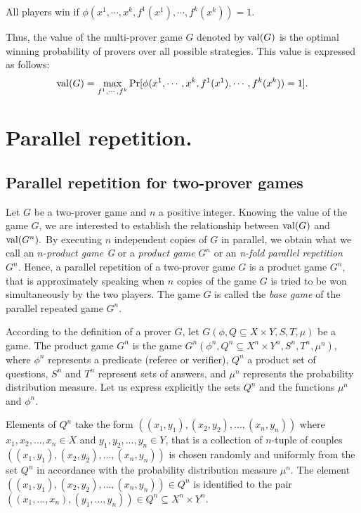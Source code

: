 All players win if $\phi (x^1, \cdots , x^k, f^1(x^1), \cdots , f^k(x^k))=1.$ 

Thus, the value of the multi-prover game $G$ denoted by $\mathrm{val} (G)$ is  the optimal winning probability of provers over all possible strategies. This value is expressed as follows:
$$\mathrm{val} (G)= \max_{f^1, \cdots , f^k} \Pr[\phi (x^1, \cdots , x^k, f^1(x^1), \cdots , f^k(x^k))=1].$$



\section{Parallel repetition.}

\subsection{Parallel repetition for  two-prover games} \label{prtp}

Let $G$ be a two-prover game and $n$ a positive integer. Knowing the value of the game $G$, we are interested 
to establish the relationship between $\mathrm{val} (G)$ and $\mathrm{val} (G^n).$  By executing  $n$ independent copies of $G$ in parallel, we obtain what we call an $n$-\textit{product game G} or a \textit{product game} $G^n$ or an \textit{n-fold parallel repetition} $G^n.$ Hence, a parallel repetition of a two-prover game $G$ is a product game $G^n$, that is approximately
speaking when $n$ copies of the game $G$ is tried to be won simultaneously by the two players. The game $G$ is called  the \textit{base game} of the parallel repeated game $G^n.$

According to the definition of a prover $G$, let $G(\phi, Q \subseteq X \times Y, S, T, \mu)$ be a game. The product game $G^n$ is the game $G^n(\phi^n, Q^n\subseteq X^n \times Y^n, S^n, T^n, \mu^n)$, where $\phi^n$ represents a predicate (referee or verifier), $Q^n$ a product set of questions, $S^n$ and $T^n$ represent sets of answers, and $\mu^n$ represents the probability distribution measure. Let us express explicitly the sets $Q^n$ and the functions $\mu^n$ and $\phi^n.$

 Elements of $Q^n$ take the form $((x_1, y_1),(x_2,y_2 ), \ldots, (x_n, y_n))$ where $x_1, x_2, \ldots, x_n \in X$ and $y_1, y_2, \ldots, y_n \in Y$, that is a collection of $n$-tuple of couples  $((x_1, y_1),(x_2,y_2 ), \ldots, (x_n, y_n))$ is chosen randomly and uniformly from the set $Q^n$ in accordance with the probability distribution measure $\mu^n $. The element  $((x_1, y_1),(x_2,y_2 ), \ldots, (x_n, y_n)) \in Q^n$ is  identified to the pair $((x_1,\ldots, x_n), (y_1, \ldots, y_n)) \in Q^n \subseteq X^n \times Y^n.$
 
